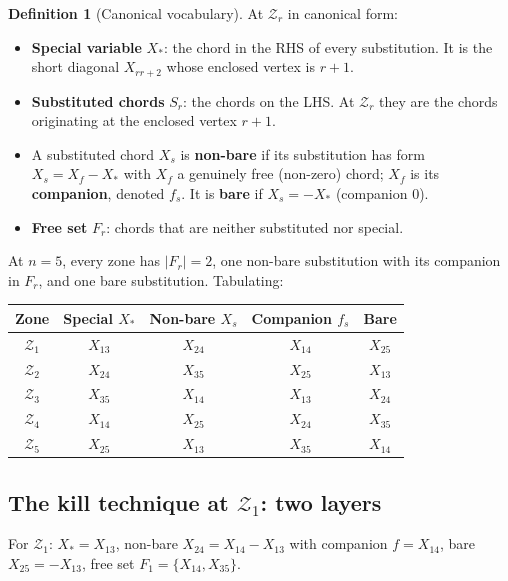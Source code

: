 \documentclass[11pt]{article}
\newcommand{\X}[2]{X_{#1#2}}
\newcommand{\Z}{\mathcal{Z}}
\theoremstyle{definition}
\newtheorem{definition}{Definition}
\begin{document}
\begin{definition}[Canonical vocabulary]
\label{def:vocabulary}
At $\Z_r$ in canonical form:
\begin{itemize}[nosep,leftmargin=2em]
\item \textbf{Special variable} $X_*$: the chord in the RHS of every
substitution. It is the short diagonal $\X{r}{r+2}$ whose enclosed vertex
is $r+1$.
\item \textbf{Substituted chords} $S_r$: the chords on the LHS. At $\Z_r$
they are the chords originating at the enclosed vertex $r+1$.
\item A substituted chord $X_s$ is \textbf{non-bare} if its substitution
has form $X_s = X_f - X_*$ with $X_f$ a genuinely free (non-zero) chord;
$X_f$ is its \textbf{companion}, denoted $f_s$. It is \textbf{bare} if
$X_s = -X_*$ (companion $0$).
\item \textbf{Free set} $F_r$: chords that are neither substituted nor
special.
\end{itemize}
\end{definition}

At $n=5$, every zone has $|F_r|=2$, one non-bare substitution with its
companion in $F_r$, and one bare substitution. Tabulating:

\begin{center}
\begin{tabular}{c|c|c|c|c}
\toprule
Zone & Special $X_*$ & Non-bare $X_s$ & Companion $f_s$ & Bare \\
\midrule
$\Z_1$ & $\X{1}{3}$ & $\X{2}{4}$ & $\X{1}{4}$ & $\X{2}{5}$ \\
$\Z_2$ & $\X{2}{4}$ & $\X{3}{5}$ & $\X{2}{5}$ & $\X{1}{3}$ \\
$\Z_3$ & $\X{3}{5}$ & $\X{1}{4}$ & $\X{1}{3}$ & $\X{2}{4}$ \\
$\Z_4$ & $\X{1}{4}$ & $\X{2}{5}$ & $\X{2}{4}$ & $\X{3}{5}$ \\
$\Z_5$ & $\X{2}{5}$ & $\X{1}{3}$ & $\X{3}{5}$ & $\X{1}{4}$ \\
\bottomrule
\end{tabular}
\end{center}

\subsection{The kill technique at \texorpdfstring{$\Z_1$}{Z1}: two layers}

For $\Z_1$: $X_*=\X{1}{3}$, non-bare $\X{2}{4}=\X{1}{4}-\X{1}{3}$
with companion $f=\X{1}{4}$, bare $\X{2}{5}=-\X{1}{3}$, free set
$F_1=\{\X{1}{4},\X{3}{5}\}$.
\end{document}
